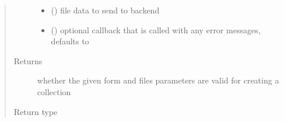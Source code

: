 \documentclass[letterpaper,10pt,english]{sphinxmanual}
\begin{document}
\begin{fulllineitems}
\begin{quote}
\begin{description}
\begin{itemize}
\item {} 
\sphinxAtStartPar
{} () \textendash{} file data to send to backend

\item {} 
\sphinxAtStartPar
{} (\sphinxstyleliteralemphasis{\sphinxupquote{, }}) \textendash{} optional callback that is called with any error messages, defaults to 

\end{itemize}

\item[{Returns}] \leavevmode
\sphinxAtStartPar
whether the given form and files parameters are valid for creating a collection

\item[{Return type}] \leavevmode
\sphinxAtStartPar
{}

\end{description}\end{quote}

\end{fulllineitems}

\end{document}

